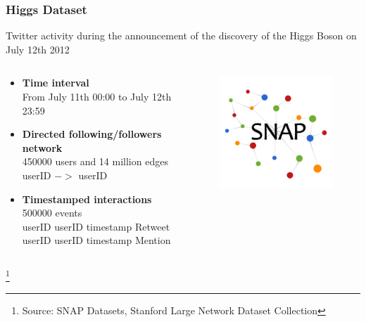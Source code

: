 \documentclass{beamer}
\newcommand\blfootnote[1]{%
  \begingroup
  \renewcommand\thefootnote{}\footnote{#1}%
  \addtocounter{footnote}{-1}%
  \endgroup
}
\begin{document}
\begin{frame}
\frametitle{Higgs Dataset}
Twitter activity during the announcement of the discovery of the Higgs Boson on July 12th 2012

\begin{columns}
\begin{column}{0.6\textwidth}
\begin{itemize}
	\item \textbf{Time interval} \\ From July 11th 00:00 to July 12th 23:59
	\item \textbf{Directed following/followers network} \\ 450000 users and 14 million edges \\\vspace{0.3cm}\hspace{0.5cm}userID $->$ userID \vspace{0.3cm}
	\item \textbf{Timestamped interactions} \\ 500000 events \\ \vspace{0.2cm}\hspace{0.5cm}userID   userID   timestamp   Retweet\\
	\hspace{0.5cm}userID userID timestamp Mention
\end{itemize}
\end{column}
\begin{column}{0.3\textwidth}
	\begin{figure}
	\includegraphics[width=0.9\linewidth]{figures/snap}
	\end{figure}
\end{column}
\end{columns}
\blfootnote{\small Source: SNAP Datasets, Stanford Large Network Dataset Collection}
\end{frame}
\end{document}
